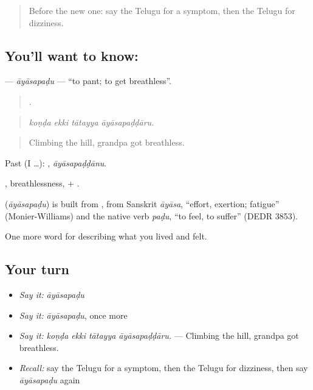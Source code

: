 \label{lesson:TE-C517-ayasapadu}



\begin{quote}
Before the new one: say the Telugu for a symptom, then the Telugu for dizziness.
\end{quote}

\subsection*{You'll want to know: }
\textbf{} — \emph{āyāsapaḍu} — \textquotedblleft{}to pant; to get breathless\textquotedblright{}.

\begin{quote}
   .
\end{quote}

\begin{quote}
\emph{koṇḍa ekki tātayya āyāsapaḍḍāru.}
\end{quote}

\begin{quote}
Climbing the hill, grandpa got breathless.
\end{quote}

Past (I …): , \emph{āyāsapaḍḍānu}.

, breathlessness, + .

\begin{cousinweb}
\textbf{} (\emph{āyāsapaḍu}) is built from , from Sanskrit \emph{āyāsa}, \textquotedblleft{}effort, exertion; fatigue\textquotedblright{} (Monier-Williams) and the native verb \emph{paḍu}, \textquotedblleft{}to feel, to suffer\textquotedblright{} (DEDR 3853).
\end{cousinweb}

\begin{grammarlens}[title={What you've built}]
One more word for describing what you lived and felt.
\end{grammarlens}

\subsection*{Your turn}
\begin{itemize}
\raggedright
  \item \emph{Say it:} \emph{āyāsapaḍu}
  \item \emph{Say it:} \emph{āyāsapaḍu}, once more
  \item \emph{Say it:} \emph{koṇḍa ekki tātayya āyāsapaḍḍāru.} — Climbing the hill, grandpa got breathless.
  \item \emph{Recall:} say the Telugu for a symptom, then the Telugu for dizziness, then say \emph{āyāsapaḍu} again
\end{itemize}

